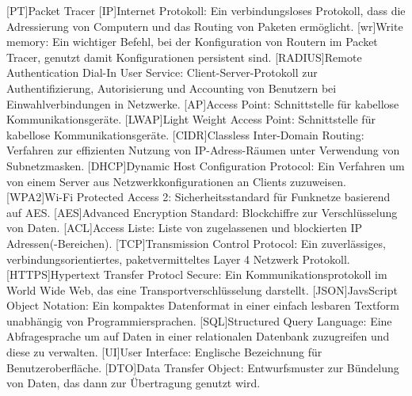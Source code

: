 \begin{acronym}
	[PT]{Packet Tracer}
	[IP]{Internet Protokoll}: Ein verbindungsloses Protokoll, dass die Adressierung von Computern und das Routing von Paketen ermöglicht.
	[wr]{Write memory}: Ein wichtiger Befehl, bei der Konfiguration von Routern im Packet Tracer, genutzt damit Konfigurationen persistent sind.
	[RADIUS]{Remote Authentication Dial-In User Service}: Client-Server-Protokoll zur Authentifizierung, Autorisierung und Accounting von Benutzern bei Einwahlverbindungen in Netzwerke.
	[AP]{Access Point}: Schnittstelle für kabellose Kommunikationsgeräte.
	[LWAP]{Light Weight Access Point}: Schnittstelle für kabellose Kommunikationsgeräte.
	[CIDR]{Classless Inter-Domain Routing}: Verfahren zur effizienten Nutzung von IP-Adress-Räumen unter Verwendung von Subnetzmasken.
	[DHCP]{Dynamic Host Configuration Protocol}: Ein Verfahren um von einem Server aus Netzwerkkonfigurationen an Clients zuzuweisen.
	[WPA2]{Wi-Fi Protected Access 2}: Sicherheitsstandard für Funknetze basierend auf AES.
	[AES]{Advanced Encryption Standard}: Blockchiffre zur Verschlüsselung von Daten.
	[ACL]{Access Liste}: Liste von zugelassenen und blockierten IP Adressen(-Bereichen).
	[TCP]{Transmission Control Protocol}: Ein zuverlässiges, verbindungsorientiertes, paketvermitteltes Layer 4 Netzwerk Protokoll.
	[HTTPS]{Hypertext Transfer Protocl Secure}: Ein Kommunikationsprotokoll im World Wide Web, das eine Transportverschlüsselung darstellt.
	[JSON]{JavsScript Object Notation}:
	Ein kompaktes Datenformat in einer einfach lesbaren Textform unabhängig von Programmiersprachen.
	[SQL]{Structured Query Language}: Eine Abfragesprache um auf Daten in einer relationalen Datenbank zuzugreifen und diese zu verwalten.
	[UI]{User Interface}: Englische Bezeichnung für Benutzeroberfläche.
	[DTO]{Data Transfer Object}: Entwurfsmuster zur Bündelung von Daten, das dann zur Übertragung genutzt wird.
\end{acronym}